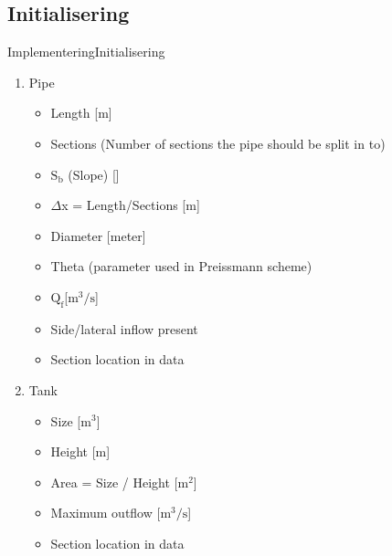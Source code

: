\subsection{Initialisering}
\begin{frame}{Implementering}{Initialisering}
    
\begin{table}[H]
\begin{enumerate} 
	\item Pipe
	\begin{itemize}
		\item Length [m]
		\item Sections (Number of sections the pipe should be split in to)
		\item $\text{S}_\text{b}$ (Slope) [\textperthousand]
		\item $\Delta$x = Length/Sections [m]
		\item Diameter [meter]
		\item Theta (parameter used in Preissmann scheme)
		\item $\text{Q}_{\text{f}}$[$\text{m}^\text{3}/\text{s}$]
		\item Side/lateral inflow present 
		\item Section location in data 
	\end{itemize}
	\item Tank
	\begin{itemize}
		\item Size [$\text{m}^\text{3}$]
		\item Height [m]
		\item Area = Size / Height [$\text{m}^\text{2}$]
		\item Maximum outflow [$\text{m}^\text{3}/\text{s}$]
		\item Section location in data 
	\end{itemize}
	
\end{enumerate}
\label{tab:init_list}
\end{table}

\end{frame}


